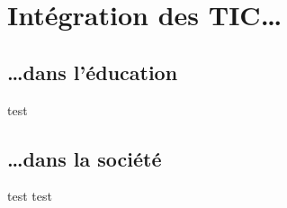 \section{Intégration des TIC\ldots}

\subsection{\ldots dans l'éducation}

\begin{frame}{test}
\end{frame}

\subsection{\ldots dans la société}

\begin{frame}{test}
test
\end{frame}
